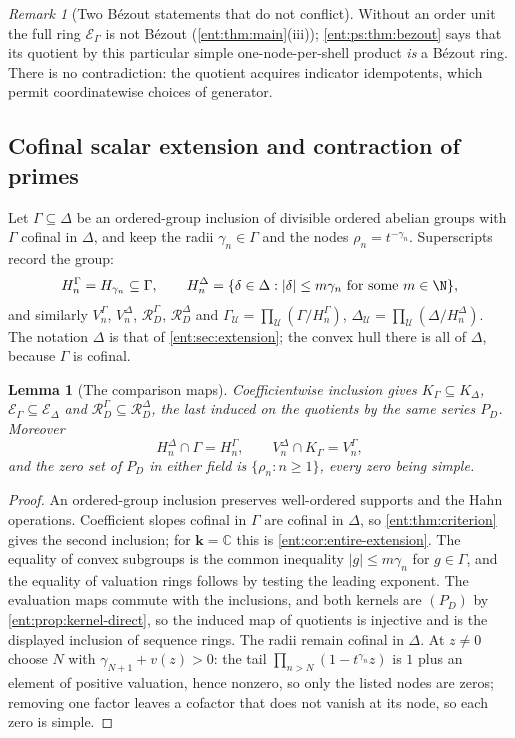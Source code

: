 \documentclass[11pt]{article}
\theoremstyle{plain}
\newtheorem{lemma}[lemma]{Lemma}
\theoremstyle{plain}
\theoremstyle{plain}
\theoremstyle{definition}
\theoremstyle{definition}
\theoremstyle{definition}
\theoremstyle{definition}
\theoremstyle{remark}
\newtheorem{remark}[remark]{Remark}
\newcommand{\C}{\mathbb C}\newcommand{\R}{\mathbb R}
\newcommand{\RD}{\mathcal R_D}\newcommand{\Ucal}{\mathcal U}
\newcommand{\abs}[1]{\lvert#1\rvert}
\newcommand{\kk}{\mathbf k}\newcommand{\PP}{\mathbb P}
\begin{document}
\begin{remark}[Two B\'ezout statements that do not conflict]
Without an order unit the full ring $\mathcal E_\Gamma$ is not B\'ezout
(\cref{ent:thm:main}(iii)); \cref{ent:ps:thm:bezout} says that its quotient by
this particular simple one-node-per-shell product \emph{is} a B\'ezout ring.
There is no contradiction: the quotient acquires indicator idempotents,
which permit coordinatewise choices of generator.
\end{remark}

\subsection{Cofinal scalar extension and contraction of primes}
\label{ent:ps:subsec:contraction}

Let $\Gamma\subseteq\Delta$ be an ordered-group inclusion of divisible
ordered abelian groups with $\Gamma$ cofinal in $\Delta$, and keep the radii
$\gamma_n\in\Gamma$ and the nodes $\rho_n=t^{-\gamma_n}$. Superscripts record
the group:
\[
 H_n^\Gamma=H_{\gamma_n}\subseteq\Gamma,\qquad
 H_n^\Delta=\{\delta\in\Delta:\abs\delta\le m\gamma_n
   \text{ for some }m\in\N\},
\]
and similarly $V_n^\Gamma$, $V_n^\Delta$, $\RD^\Gamma$, $\RD^\Delta$ and
$\Gamma_\Ucal=\prod_\Ucal(\Gamma/H_n^\Gamma)$,
$\Delta_\Ucal=\prod_\Ucal(\Delta/H_n^\Delta)$. The notation $\Delta$ is that
of \cref{ent:sec:extension}; the convex hull there is all of $\Delta$,
because $\Gamma$ is cofinal.

\begin{lemma}[The comparison maps]\label{ent:ps:lem:comparison}
Coefficientwise inclusion gives
$K_\Gamma\subseteq K_\Delta$, $\mathcal E_\Gamma\subseteq\mathcal E_\Delta$
and $\RD^\Gamma\subseteq\RD^\Delta$, the last induced on the quotients by the
same series $P_D$. Moreover
\[
 H_n^\Delta\cap\Gamma=H_n^\Gamma,\qquad
 V_n^\Delta\cap K_\Gamma=V_n^\Gamma ,
\]
and the zero set of $P_D$ in either field is $\{\rho_n:n\ge1\}$, every zero
being simple.
\end{lemma}
\begin{proof}
An ordered-group inclusion preserves well-ordered supports and the Hahn
operations. Coefficient slopes cofinal in $\Gamma$ are cofinal in $\Delta$,
so \cref{ent:thm:criterion} gives the second inclusion; for $\kk=\C$ this is
\cref{ent:cor:entire-extension}. The equality of convex subgroups is the
common inequality $\abs g\le m\gamma_n$ for $g\in\Gamma$, and the equality of
valuation rings follows by testing the leading exponent. The evaluation maps
commute with the inclusions, and both kernels are $(P_D)$ by
\cref{ent:prop:kernel-direct}, so the induced map of quotients is injective
and is the displayed inclusion of sequence rings. The radii remain cofinal in
$\Delta$. At $z\ne0$ choose $N$ with $\gamma_{N+1}+v(z)>0$: the tail
$\prod_{n>N}(1-t^{\gamma_n}z)$ is $1$ plus an element of positive valuation,
hence nonzero, so only the listed nodes are zeros; removing one factor
leaves a cofactor that does not vanish at its node, so each zero is simple.
\end{proof}
\end{document}
